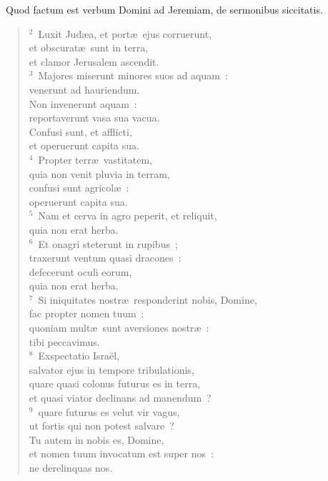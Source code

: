 ~\lettrine[lines=10,image=true,loversize=0.05,lraise=-0.03]{Q}{}uod factum est verbum Domini ad Jeremiam, de sermonibus siccitatis.
\begin{flushleft}\begin{verse}\vspace{6pt}${}^{2}$~Luxit Jud\ae a, et port\ae\ ejus corruerunt,\\ et obscurat\ae\ sunt in terra,\\ et clamor Jerusalem ascendit.\\
${}^{3}$~Majores miserunt minores suos ad aquam~:\\ venerunt ad hauriendum.\\ Non invenerunt aquam~:\\ reportaverunt vasa sua vacua.\\ Confusi sunt, et afflicti,\\ et operuerunt capita sua.\\
${}^{4}$~Propter terr\ae\ vastitatem,\\ quia non venit pluvia in terram,\\ confusi sunt agricol\ae~:\\ operuerunt capita sua.\\
${}^{5}$~Nam et cerva in agro peperit, et reliquit,\\ quia non erat herba.\\
${}^{6}$~Et onagri steterunt in rupibus~;\\ traxerunt ventum quasi dracones~:\\ defecerunt oculi eorum,\\ quia non erat herba.\\
${}^{7}$~Si iniquitates nostr\ae\ responderint nobis, Domine,\\ fac propter nomen tuum~:\\ quoniam mult\ae\ sunt aversiones nostr\ae~:\\ tibi peccavimus.\\
${}^{8}$~Exspectatio Isra\"el,\\ salvator ejus in tempore tribulationis,\\ quare quasi colonus futurus es in terra,\\ et quasi viator declinans ad manendum~?\\
${}^{9}$~quare futurus es velut vir vagus,\\ ut fortis qui non potest salvare~?\\ Tu autem in nobis es, Domine,\\ et nomen tuum invocatum est super nos~:\\ ne derelinquas nos.\\

\end{verse}
\end{flushleft}
